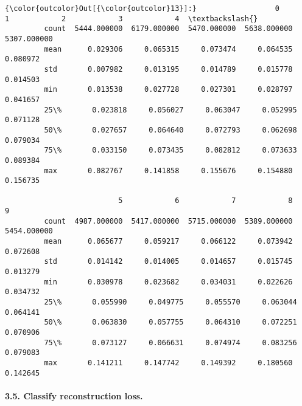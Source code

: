 \documentclass[11pt]{article}
\begin{document}
\begin{Verbatim}[commandchars=\\\{\}]
{\color{outcolor}Out[{\color{outcolor}13}]:}                  0            1            2            3            4  \textbackslash{}
         count  5444.000000  6179.000000  5470.000000  5638.000000  5307.000000   
         mean      0.029306     0.065315     0.073474     0.064535     0.080972   
         std       0.007982     0.013195     0.014789     0.015778     0.014503   
         min       0.013538     0.027728     0.027301     0.028797     0.041657   
         25\%       0.023818     0.056027     0.063047     0.052995     0.071128   
         50\%       0.027657     0.064640     0.072793     0.062698     0.079034   
         75\%       0.033150     0.073435     0.082812     0.073633     0.089384   
         max       0.082767     0.141858     0.155676     0.154880     0.156735   
         
                          5            6            7            8            9  
         count  4987.000000  5417.000000  5715.000000  5389.000000  5454.000000  
         mean      0.065677     0.059217     0.066122     0.073942     0.072608  
         std       0.014142     0.014005     0.014657     0.015745     0.013279  
         min       0.030978     0.023682     0.034031     0.022626     0.034732  
         25\%       0.055990     0.049775     0.055570     0.063044     0.064141  
         50\%       0.063830     0.057755     0.064310     0.072251     0.070906  
         75\%       0.073127     0.066631     0.074974     0.083256     0.079083  
         max       0.141211     0.147742     0.149392     0.180560     0.142645  
\end{Verbatim}
            
    \paragraph{3.5. Classify reconstruction
loss.}\label{classify-reconstruction-loss.}
\end{document}
